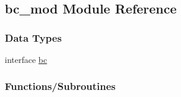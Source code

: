 \hypertarget{namespacebc__mod}{}\subsection{bc\+\_\+mod Module Reference}
\label{namespacebc__mod}
\subsubsection*{Data Types}
\begin{DoxyCompactItemize}
\item 
interface \mbox{\hyperlink{structbc__mod_1_1bc}{bc}}
\end{DoxyCompactItemize}
\subsubsection*{Functions/\+Subroutines}

